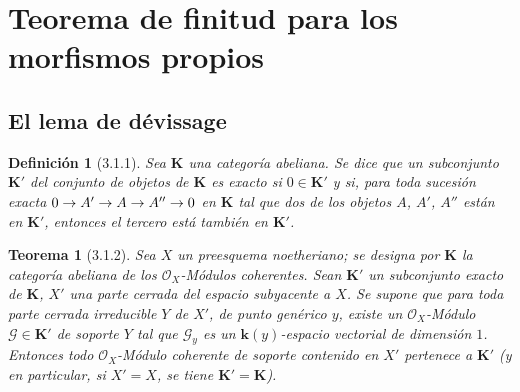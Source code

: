 \documentclass[10pt,oneside,openany]{book}
\theoremstyle{egaenv}\newtheorem*{env}{---}
\theoremstyle{egastatement}
\newtheorem*{theorem}{Teorema}
\theoremstyle{egadescription}
\newtheorem*{definition}{Definición}
\renewcommand{\to}{\mathchoice{\longrightarrow}{\rightarrow}{\rightarrow}{\rightarrow}}
\begin{document}
\section{Teorema de finitud para los morfismos propios}
\label{section:III.3}
\label{section:III.3-fr}

\subsection{El lema de d\'evissage}
\label{subsection:III.3.1}
\label{subsection:III.3.1-fr}

\begin{definition}[3.1.1]
\label{III.3.1.1-fr}
Sea $\boldsymbol{K}$ una categoría abeliana. Se dice que un subconjunto $\boldsymbol{K}'$ del
conjunto de objetos de $\boldsymbol{K}$ es exacto si $0\in\boldsymbol{K}'$ y si, para toda
sucesión exacta
$0\to A'\to A\to A''\to0$
en $\boldsymbol{K}$ tal que dos de los objetos $A$, $A'$, $A''$ están en $\boldsymbol{K}'$, entonces el
tercero está también en $\boldsymbol{K}'$.
\end{definition}

\begin{theorem}[3.1.2]
\label{III.3.1.2-fr}
Sea $X$ un preesquema noetheriano; se designa por $\boldsymbol{K}$ la categoría abeliana
de los $\mathcal O_X$-Módulos coherentes. Sean $\boldsymbol{K}'$ un subconjunto exacto de
$\boldsymbol{K}$, $X'$ una parte cerrada del espacio subyacente a $X$. Se supone que
para toda parte cerrada irreducible $Y$ de $X'$, de punto genérico $y$,
existe un $\mathcal O_X$-Módulo $\mathcal G\in\boldsymbol{K}'$ de soporte $Y$ tal que $\mathcal G_y$ es
un $\boldsymbol{k}(y)$-espacio vectorial de dimensión $1$. Entonces todo $\mathcal O_X$-Módulo
coherente de soporte contenido en $X'$ pertenece a $\boldsymbol{K}'$ (y en particular,
si $X'=X$, se tiene $\boldsymbol{K}'=\boldsymbol{K}$).
\end{theorem}
\end{document}
